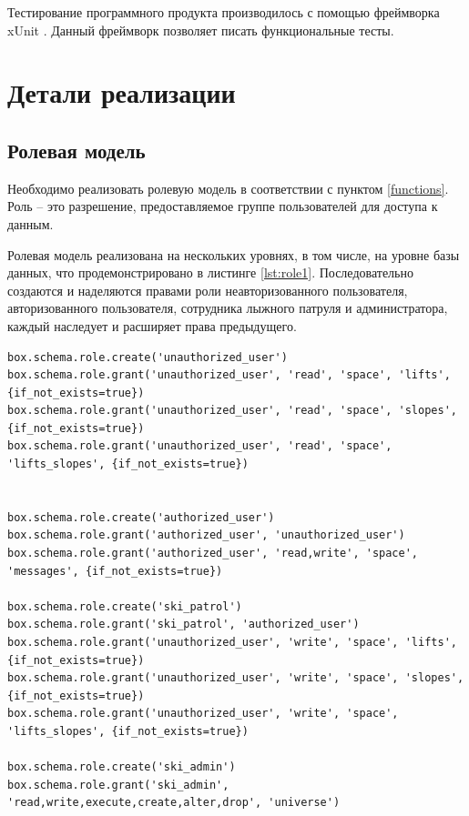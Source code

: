 Тестирование программного продукта производилось с помощью фреймворка xUnit \cite{test}. Данный фреймворк позволяет писать функциональные тесты. 

\section{Детали реализации}

\subsection{Ролевая модель}

Необходимо реализовать ролевую модель в соответствии с пунктом \ref{functions}. Роль – это разрешение, предоставляемое группе пользователей для доступа к данным. 

Ролевая модель реализована на нескольких уровнях, в том числе, на уровне базы данных, что продемонстрировано в листинге \ref{lst:role1}. Последовательно создаются и наделяются правами роли неавторизованного пользователя, авторизованного пользователя, сотрудника лыжного патруля и администратора, каждый наследует и расширяет права предыдущего.

\captionsetup{justification=centering,singlelinecheck=off}
\begin{lstlisting}[label=lst:role1, caption=Ролевая модель на уровне БД, style=myLuastyle]
box.schema.role.create('unauthorized_user')
box.schema.role.grant('unauthorized_user', 'read', 'space', 'lifts', {if_not_exists=true})
box.schema.role.grant('unauthorized_user', 'read', 'space', 'slopes', {if_not_exists=true})
box.schema.role.grant('unauthorized_user', 'read', 'space', 'lifts_slopes', {if_not_exists=true})


box.schema.role.create('authorized_user')
box.schema.role.grant('authorized_user', 'unauthorized_user')
box.schema.role.grant('authorized_user', 'read,write', 'space', 'messages', {if_not_exists=true})

box.schema.role.create('ski_patrol')
box.schema.role.grant('ski_patrol', 'authorized_user')
box.schema.role.grant('unauthorized_user', 'write', 'space', 'lifts', {if_not_exists=true})
box.schema.role.grant('unauthorized_user', 'write', 'space', 'slopes', {if_not_exists=true})
box.schema.role.grant('unauthorized_user', 'write', 'space', 'lifts_slopes', {if_not_exists=true})

box.schema.role.create('ski_admin')
box.schema.role.grant('ski_admin', 'read,write,execute,create,alter,drop', 'universe')
\end{lstlisting}

